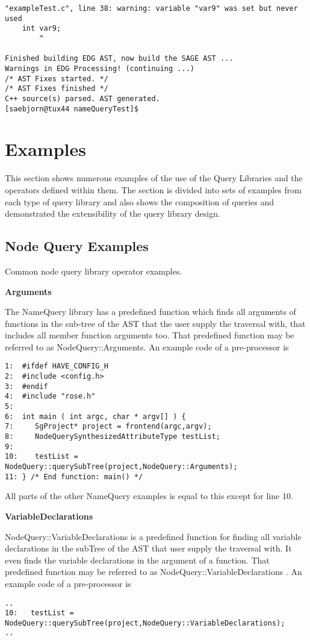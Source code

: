 {\begin{verbatim}
"exampleTest.c", line 38: warning: variable "var9" was set but never used
    int var9;
        ^

Finished building EDG AST, now build the SAGE AST ...
Warnings in EDG Processing! (continuing ...)
/* AST Fixes started. */
/* AST Fixes finished */
C++ source(s) parsed. AST generated.
[saebjorn@tux44 nameQueryTest]$
\end{verbatim}

\section{Examples}
   This section shows numerous examples of the use of the Query Libraries and
the operators defined within them.  The section is divided into sets of 
examples from each type of query library and also shows the composition
of queries and demonstrated the extensibility of the query library design.

\subsection{Node Query Examples}
   Common node query library operator examples.

\textbf{Arguments}

The NameQuery library has a predefined function which finds all 
arguments of functions in the sub-tree of the AST that the user supply the
traversal with, that includes all member function arguments too. That
predefined function may be referred to as
NodeQuery::Arguments. An example code of a
pre-processor is
\begin{verbatim}
1:  #ifdef HAVE_CONFIG_H
2:  #include <config.h>
3:  #endif
4:  #include "rose.h"
5:
6:  int main ( int argc, char * argv[] ) {
7:     SgProject* project = frontend(argc,argv);
8:     NodeQuerySynthesizedAttributeType testList;
9:	
10:    testList = NodeQuery::querySubTree(project,NodeQuery::Arguments);
11: } /* End function: main() */
\end{verbatim}
All parts of the other NameQuery examples is equal to this except for line 10.

\textbf{VariableDeclarations}

NodeQuery::VariableDeclarations is a predefined function for finding
all variable declarations in the subTree of the AST that user supply
the traversal with. It even finds the variable declarations in the
argument of a function. That predefined function may be referred to as 
NodeQuery::VariableDeclarations  . An example code of a pre-processor
is
\begin{verbatim}
..
10:   testList = NodeQuery::querySubTree(project,NodeQuery::VariableDeclarations);
..
\end{verbatim}

}
